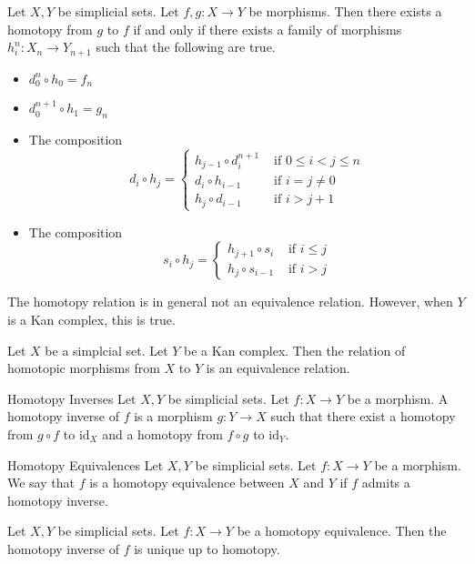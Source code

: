 \documentclass[a4paper]{article}
\begin{document}
\begin{prp}{}{} Let $X,Y$ be simplicial sets. Let $f,g:X\to Y$ be morphisms. Then there exists a homotopy from $g$ to $f$ if and only if there exists a family of morphisms $h_i^n:X_n\to Y_{n+1}$ such that the following are true. 
\begin{itemize}
\item $d_0^n\circ h_0=f_n$
\item $d_0^{n+1}\circ h_1=g_n$
\item The composition $$d_i\circ h_j=\begin{cases}
h_{j-1}\circ d_i^{n+1} & \text{ if } 0\leq i<j\leq n\\
d_i\circ h_{i-1} & \text{ if } i=j\neq 0\\
h_j\circ d_{i-1}& \text{ if } i>j+1
\end{cases}$$
\item The composition $$s_i\circ h_j=\begin{cases}
h_{j+1}\circ s_i & \text{ if } i\leq j\\
h_j\circ s_{i-1} & \text{ if } i>j
\end{cases}$$
\end{itemize}
\end{prp}

The homotopy relation is in general not an equivalence relation. However, when $Y$ is a Kan complex, this is true. 

\begin{prp}{}{} Let $X$ be a simplcial set. Let $Y$ be a Kan complex. Then the relation of homotopic morphisms from $X$ to $Y$ is an equivalence relation. 
\end{prp}

\begin{defn}{Homotopy Inverses}{} Let $X,Y$ be simplicial sets. Let $f:X\to Y$ be a morphism. A homotopy inverse of $f$ is a morphism $g:Y\to X$ such that there exist a homotopy from $g\circ f$ to $\text{id}_X$ and a homotopy from $f\circ g$ to $\text{id}_Y$. 
\end{defn}

\begin{defn}{Homotopy Equivalences}{} Let $X,Y$ be simplicial sets. Let $f:X\to Y$ be a morphism. We say that $f$ is a homotopy equivalence between $X$ and $Y$ if $f$ admits a homotopy inverse. 
\end{defn}

\begin{lmm}{}{} Let $X,Y$ be simplicial sets. Let $f:X\to Y$ be a homotopy equivalence. Then the homotopy inverse of $f$ is unique up to homotopy. 
\end{lmm}
\end{document}
